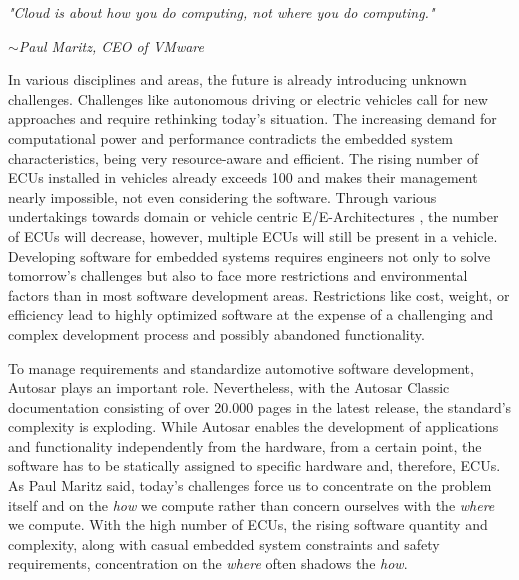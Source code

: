         \begin{center}
            \begin{minipage}{.9\textwidth}
                \textsl{"Cloud is about how you do computing, not where you do computing."}\\
                {\raggedleft \textsl{$\sim$Paul Maritz, CEO of VMware \cite{Nerdio2016}}\par}
            \end{minipage} 
        \end{center}
        
        \noindent In various disciplines and areas, the future is already  introducing unknown challenges.
        Challenges like autonomous driving or electric vehicles call for new approaches and require rethinking today's situation.
        The increasing demand for computational power and performance contradicts the embedded system characteristics, being very resource-aware and efficient.
        The rising number of \acp{ECU} installed in vehicles already exceeds 100 and makes their management nearly impossible, not even considering the software.
        Through various undertakings towards domain or vehicle centric E/E-Architectures \cite{Zerfowski2019}, the number of \acp{ECU} will decrease, however, multiple \acp{ECU} will still be present in a vehicle.
        Developing software for embedded systems requires engineers not only to solve tomorrow's challenges but also to face more restrictions and environmental factors than in most software development areas.
        Restrictions like cost, weight, or efficiency lead to highly optimized software at the expense of a challenging and complex development process and possibly abandoned functionality.
        
        \noindent To manage requirements and standardize automotive software development, Autosar plays an important role.
        Nevertheless, with the Autosar Classic documentation consisting of over 20.000 pages in the latest release, the standard's complexity is exploding.
        While Autosar enables the development of applications and functionality independently from the hardware, from a certain point, the software has to be statically assigned to specific hardware and, therefore, \acp{ECU}.
        As Paul Maritz said, today's challenges force us to concentrate on the problem itself and on the \textsl{how} we compute rather than concern ourselves with the \textsl{where} we compute.
        With the high number of \acp{ECU}, the rising software quantity and complexity, along with casual embedded system constraints and safety requirements, concentration on the \textsl{where} often shadows the \textsl{how}.
        

